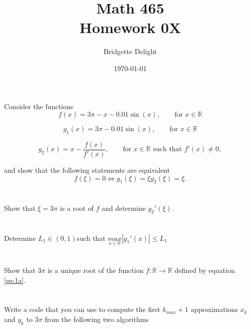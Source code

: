 \documentclass{article}
\title{{\large Math 465}\\ Homework 0X}
\author{Bridgette Delight}
\date{\today}
\begin{document}

\section{}
Consider the functions
\begin{equation}\label{eq:1a}
    f(x) = 3\pi - x - 0.01 \sin(x), \qquad \text{for }x \in \mathbb{R}
\end{equation}

\begin{equation}\label{eq:1b}
    g_1(x) = 3\pi - 0.01 \sin(x), \qquad \text{for }x \in \mathbb{R}
\end{equation}

\begin{equation}\label{eq:1c}
    g_2(x) =  x - \frac{f(x)}{f'(x)}, \qquad \text{for }x \in \mathbb{R} \text{ such that }f'(x) \ne 0,
\end{equation}

and show that the following statements are equivalent
$$f(\xi) = 0 \Longleftrightarrow g_1(\xi)=\xi g_2(\xi) = \xi.$$

\vspace{10mm}

\section{}
Show that $\xi = 3\pi$ is a root of $f$ and determine $g_2'(\xi)$.
\vspace{10mm}


\section{}
Determine $L_1 \in (0,1)$such that $\underset{x \in \mathbb{R}}{max}|g_1'(x)|\le L_1$
\vspace{10mm}


\section{}
Show that $3\pi$ is a unique root of the function $f:\mathbb{R} \xrightarrow{} \mathbb{R}$ defined by equation \ref{eq:1a}.
\vspace{10mm}

\section{}
Write a code that you can use to compute the first $k_{max}+1$ approximations $x_k$ and $y_k$ to $3\pi$ from the following two algorithms
\end{document}

